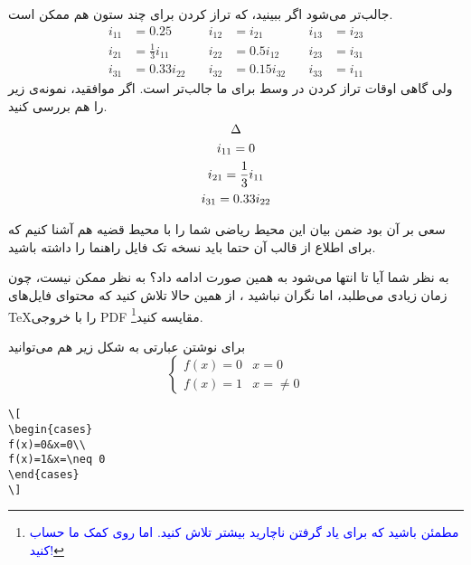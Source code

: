\begin{theorem}
\begin{description}
\end{description}
جالب‌تر می‌شود اگر ببینید، که تراز کردن برای چند ستون هم ممکن است.
\begin{align}%
i_{11} & =0.25 & i_{12} & =i_{21} & i_{13} & =i_{23}\nonumber\\
i_{21} & =\frac{1}{3}i_{11} & i_{22} & =0.5i_{12}& i_{23} & =i_{31}\\
i_{31} & =0.33i_{22}\quad & i_{32} & =0.15i_{32}\quad & i_{33} & =i_{11}
\end{align}
ولی گاهی اوقات تراز کردن در وسط برای ما جالب‌تر است. اگر موافقید، نمونه‌ی زیر را هم بررسی کنید.
\begin{gather}
\Delta\cr
i_{11} = 0\cr
i_{21} = \frac{1}{3}i_{11}\cr
i_{31} =0.33i_{22}
\end{gather}

سعی بر آن بود ضمن بیان این محیط ریاضی شما را با محیط قضیه هم آشنا کنیم که برای اطلاع از قالب آن حتما باید نسخه تک ‌فایل راهنما را داشته باشید.
\end{theorem}
\begin{description}
\iq
به نظر شما آیا تا انتها می‌شود به همین صورت ادامه داد؟
\ia
به نظر ممکن نیست، چون زمان زیادی می‌طلبد، اما نگران نباشید ، از همین حالا تلاش کنید که محتوای فایل‌های \TeX را با خروجی PDF مقایسه کنید\footnote{\textcolor{blue}{مطمئن باشید که برای یاد گرفتن ناچارید بیشتر تلاش کنید. اما روی کمک ما حساب کنید!}}.
\end{description}
\begin{point}
برای نوشتن عبارتی به شکل زیر هم می‌توانید 
\[
\begin{cases}
f(x)=0&x=0\\
f(x)=1&x=\neq 0
\end{cases}
\]
\begin{LTR}
\begin{verbatim}
\[
\begin{cases}
f(x)=0&x=0\\
f(x)=1&x=\neq 0
\end{cases}
\]
\end{verbatim}
\end{LTR}
\end{point}


